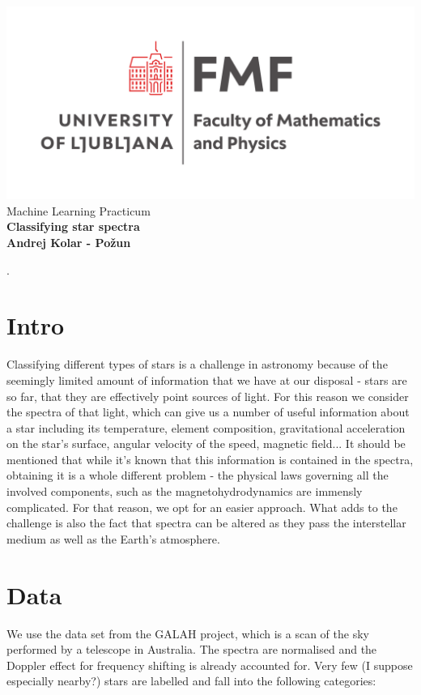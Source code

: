 \documentclass{article}
\begin{document}
\begin{titlepage}
    \begin{center}
        \vspace*{1cm}
        \Large
\includegraphics[width=.4\linewidth]{../logo.pdf}\\
        \Large
\vspace{1cm}
        Machine Learning Practicum\\
        \huge
        \textbf{Classifying star spectra\\}
\Large  
        \vspace{1cm}
        \textbf{Andrej Kolar - Po{\v z}un\\}
        \vspace{0.8cm}

\vfill
\normalsize
\end{center}. 
\end{titlepage}
\newpage
{}
\section*{Intro}
Classifying different types of stars is a challenge in astronomy because of the seemingly limited amount of information that we have at our disposal - stars are so far, that they are effectively point sources of light. For this reason we consider the spectra of that light, which can give us a number of useful information about a star including its temperature, element composition, gravitational acceleration on the star's surface, angular velocity of the speed, magnetic field... It should be mentioned that while it's known that this information is contained in the spectra, obtaining it is a whole different problem - the physical laws governing all the involved components, such as the magnetohydrodynamics are immensly complicated. For that reason, we opt for an easier approach.
What adds to the challenge is also the fact that spectra can be altered as they pass the interstellar medium as well as the Earth's atmosphere.

\section*{Data}
We use the data set from the GALAH project, which is a scan of the sky performed by a telescope in Australia.
The spectra are normalised and the Doppler effect for frequency shifting is already accounted for. Very few (I suppose especially nearby?) stars are labelled and fall into the following categories:
\end{document}
